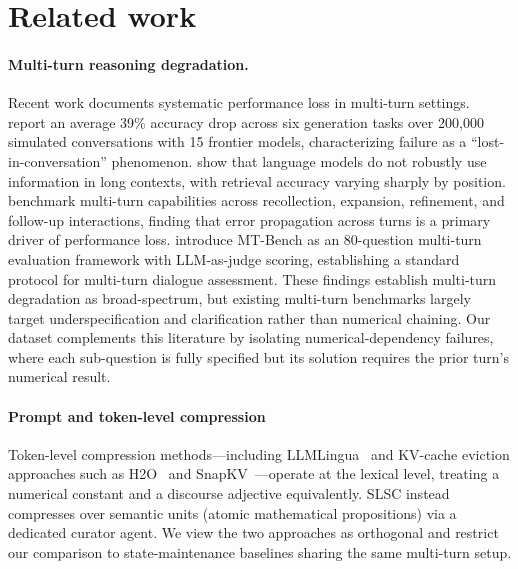 \section{Related work} \label{sec:realted}

\paragraph{Multi-turn reasoning degradation.}
Recent work documents systematic performance loss in multi-turn settings. \citet{lanban2025lost} report an average 39\% accuracy drop
across six generation tasks over 200{,}000 simulated conversations with 15 frontier models, characterizing failure as a ``lost-in-conversation''
phenomenon. \citet{liu2024lost} show that language models do not robustly use information in long contexts, with retrieval accuracy varying
sharply by position. \citet{kwan2024mteval} benchmark multi-turn capabilities across recollection, expansion, refinement, and follow-up
interactions, finding that error propagation across turns is a primary driver of performance loss. \citet{zheng2023mtbench} introduce
MT-Bench as an 80-question multi-turn evaluation framework with LLM-as-judge scoring, establishing a standard protocol for multi-turn
dialogue assessment. These findings establish multi-turn degradation as broad-spectrum, but existing multi-turn benchmarks largely target
underspecification and clarification rather than numerical chaining. Our dataset complements this literature by isolating numerical-dependency
failures, where each sub-question is fully specified but its solution requires the prior turn's numerical result.

\paragraph{Prompt and token-level compression}
Token-level compression methods---including LLMLingua~\citep{jiang2023llmlingua,jiang2024longllmlingua} and KV-cache eviction approaches such as H2O~\citep{zhang2023h2o} and SnapKV~\citep{li2024snapkv}---operate at the lexical level, treating a numerical constant and a discourse adjective equivalently. SLSC instead compresses over semantic units (atomic mathematical propositions) via a dedicated curator agent. We view the two approaches as orthogonal and restrict our comparison to state-maintenance baselines sharing the same multi-turn setup.

